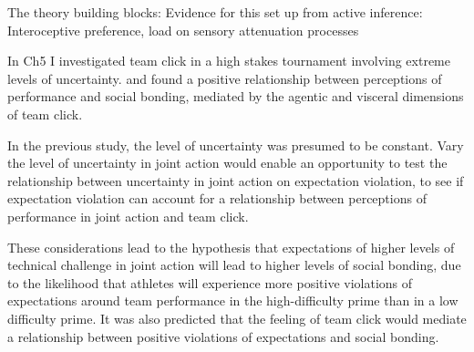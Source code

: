 The theory building blocks:
Evidence for this set up from active inference:
Interoceptive preference,
load on sensory attenuation processes

In Ch5 I investigated team click in a high stakes tournament involving extreme levels of uncertainty.  and found a positive relationship between perceptions of performance and social bonding, mediated by the agentic and visceral dimensions of team click.

In the previous study, the level of uncertainty was presumed to be constant. Vary the level of uncertainty in joint action would enable an opportunity to test the relationship between uncertainty in joint action on expectation violation, to see if expectation violation can account for a relationship between perceptions of performance in joint action and team click.

These considerations lead to the hypothesis that expectations of higher levels of technical challenge in joint action will lead to higher levels of social bonding, due to the likelihood that athletes will experience more positive violations of expectations around team performance in the high-difficulty prime than in a low difficulty prime.  It was also predicted that the feeling of team click would mediate a relationship between positive violations of expectations and social bonding.






